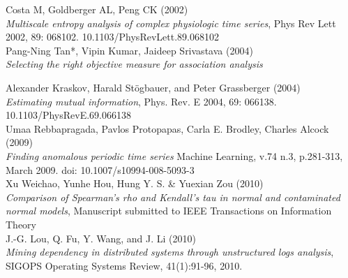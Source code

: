 \documentclass[12pt,a4paper]{article}
\begin{document}
\begin{thebibliography}{9}
Costa M, Goldberger AL, Peng CK (2002)\\
\textit{Multiscale entropy analysis of complex physiologic time series},
Phys Rev Lett 2002, 89: 068102. 10.1103/PhysRevLett.89.068102\\

Pang-Ning Tan*, Vipin Kumar, Jaideep Srivastava (2004)\\
\textit{Selecting the right objective measure for association analysis}

Alexander Kraskov, Harald Stögbauer, and Peter Grassberger (2004)\\
\textit{Estimating mutual information}, 
Phys. Rev. E 2004, 69: 066138. 10.1103/PhysRevE.69.066138\\


Umaa Rebbapragada, Pavlos Protopapas, Carla E. Brodley, Charles Alcock (2009)\\
\textit{Finding anomalous periodic time series}
Machine Learning, v.74 n.3, p.281-313, March 2009. doi: 10.1007/s10994-008-5093-3\\

Xu Weichao, Yunhe Hou, Hung Y. S. \& Yuexian Zou (2010)\\
\textit{Comparison of Spearman's rho and Kendall's tau in normal and contaminated normal models}, Manuscript submitted to IEEE Transactions on Information Theory\\

 J.-G. Lou, Q. Fu, Y. Wang, and J. Li (2010)\\
\textit{Mining dependency in distributed systems through unstructured logs analysis}, SIGOPS Operating Systems Review, 41(1):91-96, 2010.


\end{thebibliography}
\end{document}

